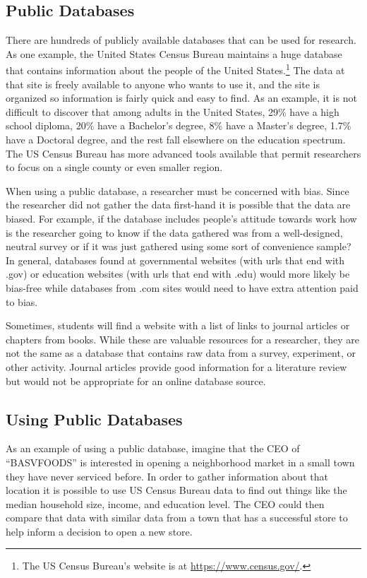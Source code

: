 \subsection{Public Databases}

There are hundreds of publicly available databases that can be used for research. As one example, the United States Census Bureau maintains a huge database that contains information about the people of the United States.\footnote{The US Census Bureau's website is at \url{https://www.census.gov/}.} The data at that site is freely available to anyone who wants to use it, and the site is organized so information is fairly quick and easy to find. As an example, it is not difficult to discover that among adults in the United States, 29\% have a high school diploma, 20\% have a Bachelor's degree, 8\% have a Master's degree, 1.7\% have a Doctoral degree, and the rest fall elsewhere on the education spectrum. The US Census Bureau has more advanced tools available that permit researchers to focus on a single county or even smaller region.

When using a public database, a researcher must be concerned with bias. Since the researcher did not gather the data first-hand it is possible that the data are biased. For example, if the database includes people's attitude towards work how is the researcher going to know if the data gathered was from a well-designed, neutral survey or if it was just gathered using some sort of convenience sample? In general, databases found at governmental websites (with urls that end with .gov) or education websites (with urls that end with .edu) would more likely be bias-free while databases from .com sites would need to have extra attention paid to bias.

Sometimes, students will find a website with a list of links to journal articles or chapters from books. While these are valuable resources for a researcher, they are not the same as a database that contains raw data from a survey, experiment, or other activity. Journal articles provide good information for a literature review but would not be appropriate for an online database source.

\subsection{Using Public Databases}

As an example of using a public database, imagine that the CEO of ``BASVFOODS'' is interested in opening a neighborhood market in a small town they have never serviced before. In order to gather information about that location it is possible to use US Census Bureau data to find out things like the median household size, income, and education level. The CEO could then compare that data with similar data from a town that has a successful store to help inform a decision to open a new store.

